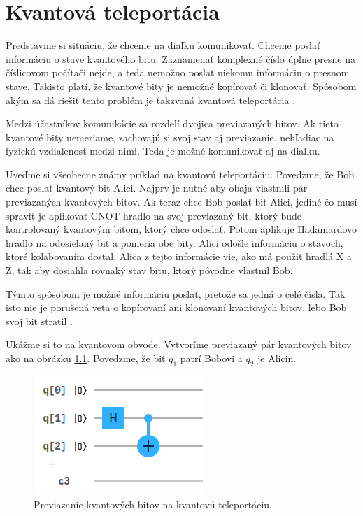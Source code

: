 
\chapter{Kvantová teleportácia}

Predstavme si situáciu, že chceme na diaľku komunikovať. Chceme poslať
informáciu o stave kvantového bitu. Zaznamenať komplexné číslo úplne presne 
na číslicovom počítači nejde, a teda nemožno poslať niekomu informáciu o 
presnom stave. Takisto platí, že kvantové bity je nemožné kopírovať či
klonovať. Spôsobom akým sa dá riešiť tento problém je takzvaná kvantová
teleportácia \cite{Wat+01}.

Medzi účastníkov komunikácie sa rozdelí dvojica previazaných bitov. Ak tieto
kvantové bity nemeriame, zachovajú si svoj stav aj previazanie, nehľadiac
na fyzickú vzdialenosť medzi nimi. Teda je možné komunikovať aj na diaľku.

Uveďme si všeobecne známy príklad na kvantovú teleportáciu. Povedzme, že 
Bob chce poslať kvantový bit Alici. Najprv je nutné aby obaja vlastnili
pár previazaných kvantových bitov. Ak teraz chce Bob poslať bit Alici, jediné
čo musí spraviť je aplikovať CNOT hradlo na svoj previazaný bit, ktorý bude 
kontrolovaný kvantovým bitom, ktorý chce odoslať. Potom aplikuje Hadamardovo
hradlo na odosielaný bit a pomeria obe bity. Alici odošle informáciu o
stavoch, ktoré kolabovaním dostal. Alica z tejto informácie vie, ako má použiť
hradlá X a Z, tak aby dosiahla rovnaký stav bitu, ktorý pôvodne vlastnil Bob.

Týmto spôsobom je možné informáciu poslať, pretože sa jedná o celé čísla.
Tak isto nie je porušená veta o kopírovaní ani klonovaní kvantových bitov, 
lebo Bob svoj bit stratil \cite{Wol+01}.

Ukážme si to na kvantovom obvode. Vytvoríme previazaný pár kvantových bitov
ako na obrázku \ref{tel_c1}. Povedzme, že bit \(q_1\) patrí Bobovi a \(q_2\)
je Alicin.

\begin{figure}[H]
	\centering 
	\includegraphics[width=.5\textwidth]{figures/tel_c1.png} 
	\caption{Previazanie kvantových bitov na kvantovú teleportáciu.}
    \label{tel_c1}
\end{figure}

